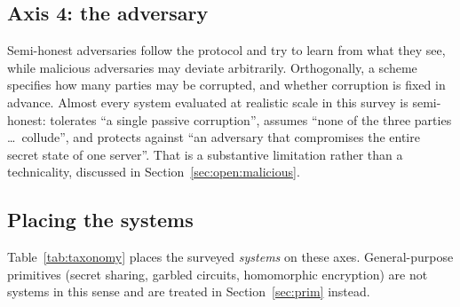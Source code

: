 \subsection{Axis 4: the adversary}
\label{sec:taxonomy:adversary}

Semi-honest adversaries follow the protocol and try to learn from what they see, while malicious
adversaries may deviate arbitrarily. Orthogonally, a scheme specifies how many parties may be
corrupted, and whether corruption is fixed in advance. Almost every system evaluated at realistic
scale in this survey is semi-honest: \duoram{} tolerates ``a single passive corruption'',
\prac{} assumes ``none of the three parties \dots\ collude'', and \nudge{} protects against ``an
adversary that compromises the entire secret state of one server''. That is a substantive
limitation rather than a technicality, discussed in Section~\ref{sec:open:malicious}.

\subsection{Placing the systems}
\label{sec:taxonomy:table}

Table~\ref{tab:taxonomy} places the surveyed \emph{systems} on these axes. General-purpose
primitives (secret sharing, garbled circuits, homomorphic encryption) are not systems in this
sense and are treated in Section~\ref{sec:prim} instead.

